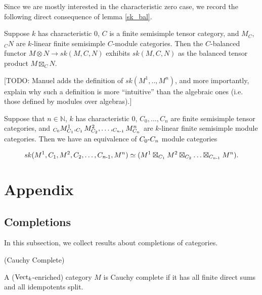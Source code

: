 Since we are mostly interested in the characteristic zero case, we record the
following direct consequence of lemma \ref{sk_bal}.

\begin{theorem}
   Suppose $k$ has characteristic $0$, $C$ is a finite semisimple tensor
   category, and $M_C$,$_{C}N$ are $k$-linear finite semisimple $C$-module
   categories. Then the $C$-balanced functor $M\otimes N\to sk(M,C,N)$
   exhibits $sk(M,C,N)$ as the balanced tensor product $M\boxtimes_C
   N$.
\end{theorem}

[TODO: Manuel adds the definition of $sk(M^{1},..,M^{n})$, and more
importantly, explain why such a definition is more ``intuitive'' than the
algebraic ones (i.e. those defined by modules over algebras).]

\begin{corollary}
  Suppose that $n \in \mathbb{N}$, $k$ has characteristic $0$, $C_{0}, \ldots,
  C_{n}$ are finite semisimple tensor categories, and $_{C_{0}}M^{1}_{C_{1}},
  _{C_{1}}M^{2}_{C_{2}}, \ldots, _{C_{n{\text -}1}}M^{n}_{C_{n}}$ are
  $k$-linear finite semisimple module categories. Then we have an equivalence
  of $C_{0}{\text -}C_{n}$ module categories

  \[
    sk(M^{1}, C_{1}, M^{2}, C_{2}, \ldots, C_{n{\text -} 1}, M^{n})
    \simeq
    (M^{1} \boxtimes_{C_{1}} M^{2} \boxtimes_{C_{2}} \ldots \boxtimes_{C_{n{\text -}1}} M^{n}).
  \]
\end{corollary}

\appendix
\section{Appendix}
   
\subsection{Completions}

\noindent In this subsection, we collect results about completions of categories.

\begin{definition} (Cauchy Complete)

  \noindent A ($\operatorname{Vect}_k$-enriched) category $M$ is Cauchy complete if it has
  all finite direct sums and all idempotents split.
\end{definition}


